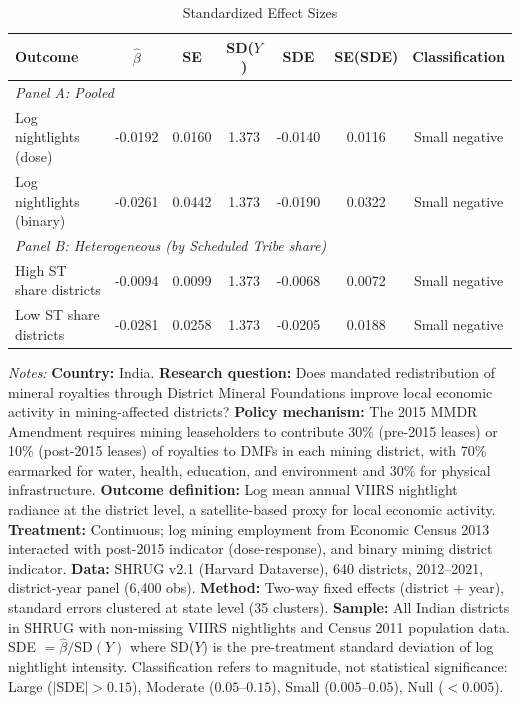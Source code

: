 \begin{table}[t]
\centering
\caption{Standardized Effect Sizes}
\label{tab:sde}
\small
\begin{threeparttable}
\begin{tabular}{lcccccc}
\toprule
Outcome & $\hat{\beta}$ & SE & SD($Y$) & SDE & SE(SDE) & Classification \\
\midrule
\multicolumn{7}{l}{\textit{Panel A: Pooled}} \\
Log nightlights (dose) & -0.0192 & 0.0160 & 1.373 & -0.0140 & 0.0116 & Small negative \\
Log nightlights (binary) & -0.0261 & 0.0442 & 1.373 & -0.0190 & 0.0322 & Small negative \\
\midrule
\multicolumn{7}{l}{\textit{Panel B: Heterogeneous (by Scheduled Tribe share)}} \\
High ST share districts & -0.0094 & 0.0099 & 1.373 & -0.0068 & 0.0072 & Small negative \\
Low ST share districts & -0.0281 & 0.0258 & 1.373 & -0.0205 & 0.0188 & Small negative \\
\bottomrule
\end{tabular}
\begin{tablenotes}
\item \textit{Notes:} \textbf{Country:} India. \textbf{Research question:} Does mandated redistribution of mineral royalties through District Mineral Foundations improve local economic activity in mining-affected districts? \textbf{Policy mechanism:} The 2015 MMDR Amendment requires mining leaseholders to contribute 30\% (pre-2015 leases) or 10\% (post-2015 leases) of royalties to DMFs in each mining district, with 70\% earmarked for water, health, education, and environment and 30\% for physical infrastructure. \textbf{Outcome definition:} Log mean annual VIIRS nightlight radiance at the district level, a satellite-based proxy for local economic activity. \textbf{Treatment:} Continuous; log mining employment from Economic Census 2013 interacted with post-2015 indicator (dose-response), and binary mining district indicator. \textbf{Data:} SHRUG v2.1 (Harvard Dataverse), 640 districts, 2012--2021, district-year panel (6,400 obs). \textbf{Method:} Two-way fixed effects (district + year), standard errors clustered at state level (35 clusters). \textbf{Sample:} All Indian districts in SHRUG with non-missing VIIRS nightlights and Census 2011 population data. SDE $= \hat{\beta} / \text{SD}(Y)$ where SD($Y$) is the pre-treatment standard deviation of log nightlight intensity. Classification refers to magnitude, not statistical significance: Large ($|$SDE$| > 0.15$), Moderate ($0.05$--$0.15$), Small ($0.005$--$0.05$), Null ($< 0.005$).
\end{tablenotes}
\end{threeparttable}
\end{table}
